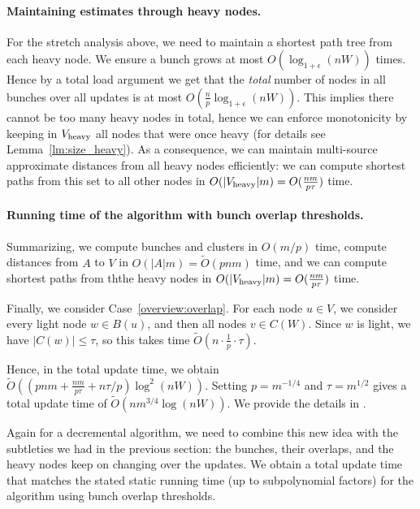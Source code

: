 \paragraph{Maintaining estimates through heavy nodes.}
For the stretch analysis above, we need to maintain a shortest path tree from each heavy node. We ensure a bunch grows at most $O(\log_{1+\epsilon}(nW))$ times. Hence by a total load argument we get that the \emph{total} number of nodes in all bunches over all updates is at most $O(\tfrac{n}{p}\log_{1+\epsilon}(nW))$. This implies there cannot be too many heavy nodes in total, hence we can enforce monotonicity by keeping in $V_{\rm{heavy}}$ all nodes that were once heavy (for details see Lemma~\ref{lm:size_heavy}). As a consequence, we can maintain multi-source approximate distances from all heavy nodes efficiently: we can compute shortest paths from this set to all other nodes in $O(|V_{\rm{heavy}}|m)=O(\tfrac{nm}{p\tau})$ time.


\paragraph{Running time of the algorithm with bunch overlap thresholds.}
Summarizing, we compute bunches and clusters in $O(m/p)$ time, compute distances from $A$ to $V$ in $O(|A|m)=\tilde O(pnm)$ time, and we can compute shortest paths from ththe heavy nodes in $O(|V_{\rm{heavy}}|m)=O(\tfrac{nm}{p\tau})$ time.


Finally, we consider Case~\ref{overview:overlap}. For each node $u\in V$, we consider every light node $w\in B(u)$, and then all nodes $v\in C(W)$. Since $w$ is light, we have $|C(w)|\leq \tau$, so this takes time $\tilde O(n\cdot \tfrac{1}{p}\cdot \tau)$.  

Hence, in the total update time, we obtain $\tilde O((pnm+\tfrac{nm}{p\tau}+n\tau/p)\log^2(nW))$. Setting $p=m^{-1/4}$ and $\tau = m^{1/2}$ gives a total update time of $\tilde O(nm^{3/4}\log(nW))$. We provide the details in .

Again for a decremental algorithm, we need to combine this new idea with the subtleties we had in the previous section: the bunches, their overlaps, and the heavy nodes keep on changing over the updates. We obtain a total update time that matches the stated static running time (up to subpolynomial factors) for the algorithm using bunch overlap thresholds. 

 





